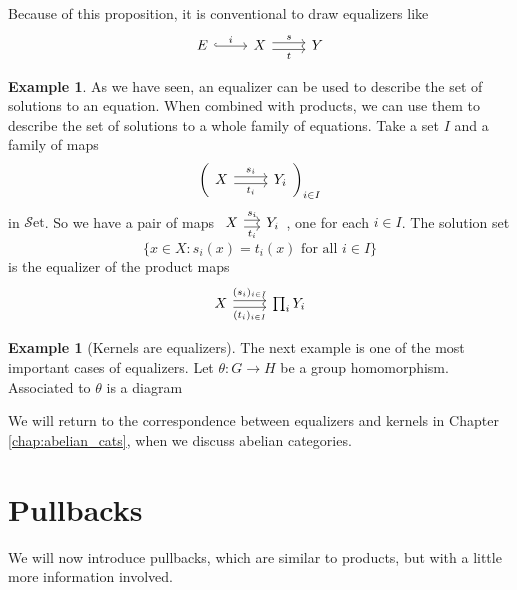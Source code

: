 \documentclass[10pt,oneside]{book}
\def\~#1{\mathscr{#1}}
\newcommand{\Set}{\~S\mathrm{et}}
\theoremstyle{plain}
\theoremstyle{definition}
\newtheorem{ex}[thm]{Example}
\theoremstyle{remark}
\numberwithin{equation}{section}
\numberwithin{figure}{section}
\begin{document}
Because of this proposition, it is conventional to draw equalizers like 
\[\begin{tikzcd}
            E & X & Y
            \arrow["i", hook, from=1-1, to=1-2]
            \arrow["t"', shift right, from=1-2, to=1-3]
            \arrow["s", shift left, from=1-2, to=1-3]
        \end{tikzcd}\]

\begin{ex}
As we have seen, an equalizer can be used to describe the set of solutions to an equation. When combined with products, we can use them to describe the set of solutions to a whole family of equations. Take a set $I$ and a family of maps
\[\left( \begin{tikzcd} X \arrow[r, shift left]{}{s_i} \arrow[r, shift right, swap]{}{t_i} & Y_i \end{tikzcd} \right)_{i \in I}\] 
in $\Set$. So we have a pair of maps $\begin{tikzcd}[column sep = small] X \arrow[r, shift left]{}{s_i} \arrow[r, shift right, swap]{}{t_i} & Y_i\end{tikzcd}$, one for each $i \in I$. The solution set 
\[\{x \in X : s_i(x) = t_i(x) \text{ for all } i \in I \}\]
is the equalizer of the product maps 
\[\begin{tikzcd} X \arrow[r, shift left]{}{(s_i)_{i \in I}} \arrow[r, shift right, swap]{}{(t_i)_{i \in I}} & \prod_i Y_i\end{tikzcd}\]
\end{ex}

\begin{ex}[Kernels are equalizers]
    The next example is one of the most important cases of equalizers. Let $\theta: G \to H$ be a group homomorphism. Associated to $\theta$ is a diagram

    We will return to the correspondence between equalizers and kernels in Chapter \ref{chap:abelian_cats}, when we discuss abelian categories.
\end{ex}

\section{Pullbacks}

We will now introduce pullbacks, which are similar to products, but with a little more information involved.
\end{document}
